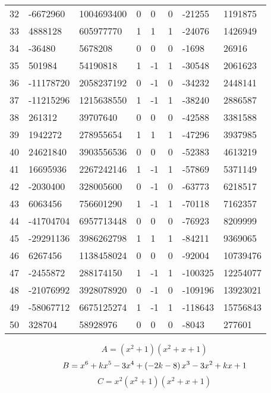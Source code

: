 \documentclass{amsart}
\begin{document}
\begin{longtable}{|l|l|l|lllll|}
32&-6672960&1004693400&0&0&0&-21255&1191875\\
33&4888128&605977770&1&1&1&-24076&1426949\\
34&-36480&5678208&0&0&0&-1698&26916\\
35&501984&54190818&1&-1&1&-30548&2061623\\
36&-11178720&2058237192&0&-1&0&-34232&2448141\\
37&-11215296&1215638550&1&-1&1&-38240&2886587\\
38&261312&39707640&0&0&0&-42588&3381588\\
39&1942272&278955654&1&1&1&-47296&3937985\\
40&24621840&3903556536&0&0&0&-52383&4613219\\
41&16695936&2267242146&1&-1&1&-57869&5371149\\
42&-2030400&328005600&0&-1&0&-63773&6218517\\
43&6063456&756601290&1&-1&1&-70118&7162357\\
44&-41704704&6957713448&0&0&0&-76923&8209999\\
45&-29291136&3986262798&1&1&1&-84211&9369065\\
46&6267456&1138458024&0&0&0&-92004&10739476\\
47&-2455872&288174150&1&-1&1&-100325&12254077\\
48&-21076992&3928078920&0&-1&0&-109196&13923021\\
49&-58067712&6675125274&1&-1&1&-118643&15756843\\
50&328704&58928976&0&0&0&-8043&277601\\
\hline
\end{longtable}
$$A=(x^2
 + 1)(x^2
 + x
 + 1)$$
$$B=x^6
 + k\*x^5
 - 3\*x^4
 + \left(-2\*k
 - 8\right) \*x^3
 - 3\*x^2
 + k\*x
 + 1$$
$$C=x^2(x^2
 + 1)(x^2
 + x
 + 1)$$
\end{document}
